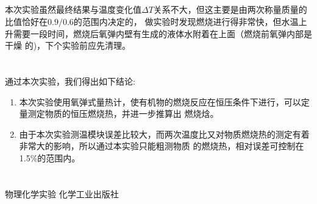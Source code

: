 ﻿\documentclass[10.5pt]{article}
\begin{document}
\subsection{\textbf{}}
本次实验虽然最终结果与温度变化值$\Delta T$关系不大，但这主要是由两次称量质量的比值恰好在$0.9/0.6$的范围内决定的，
做实验时发现燃烧进行得非常快，但水温上升需要一段时间，燃烧后氧弹内壁有生成的液体水附着在上面（燃烧前氧弹内部是干燥
的)，下个实验前应先清理。

\section{\textbf{}}

通过本次实验，我们得出如下结论:
\begin{enumerate}
\item 本次实验使用氧弹式量热计，使有机物的燃烧反应在恒压条件下进行，可以定量测定物质的恒压燃烧热，并进一步推算出
燃烧焓。
\item 由于本次实验测温模块误差比较大，而两次温度比又对物质燃烧热的测定有着非常大的影响，所以通过本实验只能粗测物质
的燃烧热，相对误差可控制在1.5\%的范围内。
\end{enumerate}

\section{\textbf{}}
\begin{thebibliography}{}
物理化学实验 \quad 化学工业出版社
\end{thebibliography}
\end{document}
